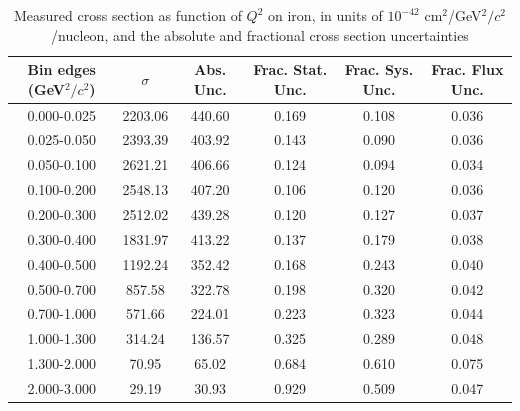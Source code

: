 \documentclass[../main.tex]{subfiles}
\begin{document}
\begin{table}
  \centering
  \renewcommand{\arraystretch}{1.15}
  \caption{Measured cross section as function of $Q^2$ on iron, in units of $10^{-42}$ $\text{cm}^2$/GeV${}^2/c{}^2$/nucleon, and the absolute and fractional cross section uncertainties}
    \begin{tabular}{c||c|c||c|c|c}
      Bin edges (GeV${}^2/c{}^2$) &  $\sigma$  &  Abs. Unc.  &  Frac. Stat. Unc.  &  Frac. Sys. Unc.  &  Frac. Flux Unc. \\
      \hline
      \hline
      0.000-0.025 & 2203.06 & 440.60 & 0.169 & 0.108 & 0.036\\
      0.025-0.050 & 2393.39 & 403.92 & 0.143 & 0.090 & 0.036\\
      0.050-0.100 & 2621.21 & 406.66 & 0.124 & 0.094 & 0.034\\
      0.100-0.200 & 2548.13 & 407.20 & 0.106 & 0.120 & 0.036\\
      0.200-0.300 & 2512.02 & 439.28 & 0.120 & 0.127 & 0.037\\
      0.300-0.400 & 1831.97 & 413.22 & 0.137 & 0.179 & 0.038\\
      0.400-0.500 & 1192.24 & 352.42 & 0.168 & 0.243 & 0.040\\
      0.500-0.700 & 857.58 & 322.78 & 0.198 & 0.320 & 0.042\\
      0.700-1.000 & 571.66 & 224.01 & 0.223 & 0.323 & 0.044\\
      1.000-1.300 & 314.24 & 136.57 & 0.325 & 0.289 & 0.048\\
      1.300-2.000 & 70.95 & 65.02 & 0.684 & 0.610 & 0.075\\
      2.000-3.000 & 29.19 & 30.93 & 0.929 & 0.509 & 0.047
    \end{tabular}
  \label{tbl:datanucleonnuc26q2a}
\end{table}
\pagebreak
\end{document}
